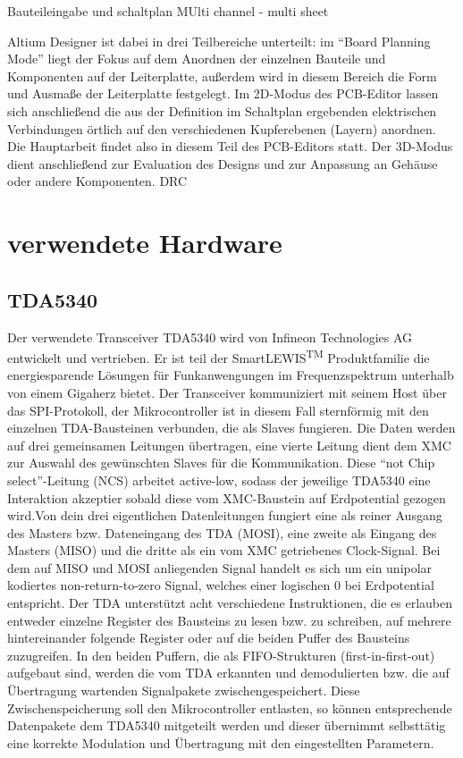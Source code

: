Bauteileingabe und schaltplan
MUlti channel - multi sheet




Altium Designer ist dabei in drei Teilbereiche unterteilt: im \enquote{Board Planning Mode}  liegt der Fokus auf dem Anordnen der einzelnen Bauteile und Komponenten auf der Leiterplatte, außerdem wird in diesem Bereich die Form und Ausmaße der Leiterplatte festgelegt. Im 2D-Modus des PCB-Editor lassen sich anschließend die aus der Definition im Schaltplan ergebenden elektrischen Verbindungen örtlich auf den verschiedenen Kupferebenen (Layern) anordnen. Die Hauptarbeit findet also in diesem Teil des PCB-Editors statt. Der 3D-Modus dient anschließend zur Evaluation des Designs und zur Anpassung an Gehäuse oder andere Komponenten.
DRC

\section{verwendete Hardware}

\subsection{TDA5340}
Der verwendete Transceiver TDA5340 wird von Infineon Technologies AG  entwickelt und vertrieben. Er ist teil der SmartLEWIS\textsuperscript{TM} Produktfamilie die  energiesparende Lösungen für Funkanwengungen im Frequenzspektrum unterhalb von einem Gigaherz bietet. 
Der Transceiver kommuniziert mit seinem Host über das SPI-Protokoll, der Mikrocontroller ist in diesem Fall sternförmig mit den einzelnen TDA-Bausteinen verbunden, die als Slaves fungieren. Die Daten werden auf drei gemeinsamen Leitungen übertragen, eine vierte Leitung dient dem XMC zur Auswahl des gewünschten Slaves für die Kommunikation. Diese \enquote{not Chip select}-Leitung (NCS) arbeitet active-low, sodass der jeweilige TDA5340 eine Interaktion akzeptier sobald diese vom XMC-Baustein auf Erdpotential gezogen wird.Von dein drei eigentlichen Datenleitungen fungiert eine als reiner Ausgang des Masters bzw. Dateneingang des TDA (MOSI), eine zweite als Eingang des Masters (MISO) und die dritte als ein vom XMC getriebenes Clock-Signal. Bei dem auf MISO und MOSI anliegenden Signal handelt es sich um ein unipolar kodiertes non-return-to-zero Signal, welches einer logischen $0$ bei Erdpotential entspricht. Der TDA unterstützt acht verschiedene Instruktionen, die es erlauben entweder einzelne Register des Bausteins zu lesen bzw. zu schreiben, auf mehrere hintereinander folgende Register  oder auf die beiden Puffer des Bausteins zuzugreifen. In den beiden Puffern, die als FIFO-Strukturen (first-in-first-out) aufgebaut sind, werden die vom TDA erkannten und demodulierten bzw. die auf Übertragung wartenden Signalpakete zwischengespeichert. Diese Zwischenspeicherung soll den Mikrocontroller entlasten, so können entsprechende Datenpakete dem TDA5340 mitgeteilt werden und dieser übernimmt selbsttätig eine korrekte Modulation und Übertragung mit den eingestellten Parametern. 


